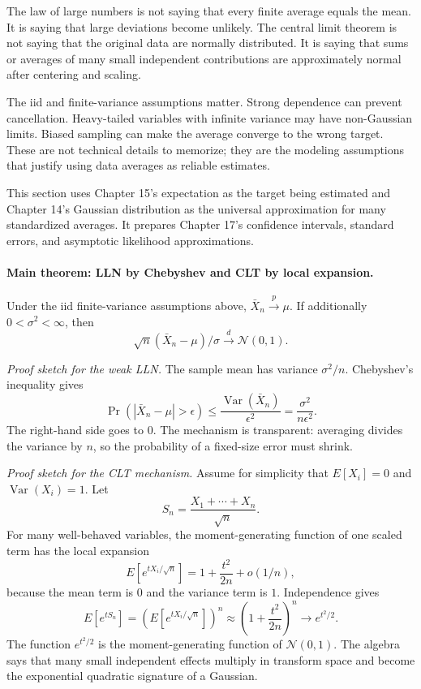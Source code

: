 The law of large numbers is not saying that every finite average equals the mean. It is saying that large deviations become unlikely. The central limit theorem is not saying that the original data are normally distributed. It is saying that sums or averages of many small independent contributions are approximately normal after centering and scaling.

The iid and finite-variance assumptions matter. Strong dependence can prevent cancellation. Heavy-tailed variables with infinite variance may have non-Gaussian limits. Biased sampling can make the average converge to the wrong target. These are not technical details to memorize; they are the modeling assumptions that justify using data averages as reliable estimates.

This section uses Chapter 15's expectation as the target being estimated and Chapter 14's Gaussian distribution as the universal approximation for many standardized averages. It prepares Chapter 17's confidence intervals, standard errors, and asymptotic likelihood approximations.

\paragraph{Main theorem: LLN by Chebyshev and CLT by local expansion.}
Under the iid finite-variance assumptions above, \(\bar X_n\xrightarrow{p}\mu\). If additionally \(0<\sigma^2<\infty\), then
\[
\sqrt n(\bar X_n-\mu)/\sigma \xrightarrow{d}\mathcal N(0,1).
\]

\emph{Proof sketch for the weak LLN.}
The sample mean has variance \(\sigma^2/n\). Chebyshev's inequality gives
\[
\Pr(|\bar X_n-\mu|>\epsilon)
\leq
\frac{\operatorname{Var}(\bar X_n)}{\epsilon^2}
=
\frac{\sigma^2}{n\epsilon^2}.
\]
The right-hand side goes to \(0\). The mechanism is transparent: averaging divides the variance by \(n\), so the probability of a fixed-size error must shrink.

\emph{Proof sketch for the CLT mechanism.}
Assume for simplicity that \(E[X_i]=0\) and \(\operatorname{Var}(X_i)=1\). Let
\[
S_n=\frac{X_1+\cdots+X_n}{\sqrt n}.
\]
For many well-behaved variables, the moment-generating function of one scaled term has the local expansion
\[
E[e^{tX_i/\sqrt n}]
=1+\frac{t^2}{2n}+o(1/n),
\]
because the mean term is \(0\) and the variance term is \(1\). Independence gives
\[
E[e^{tS_n}]
=\left(E[e^{tX_i/\sqrt n}]\right)^n
\approx
\left(1+\frac{t^2}{2n}\right)^n
\to e^{t^2/2}.
\]
The function \(e^{t^2/2}\) is the moment-generating function of \(\mathcal N(0,1)\). The algebra says that many small independent effects multiply in transform space and become the exponential quadratic signature of a Gaussian.

